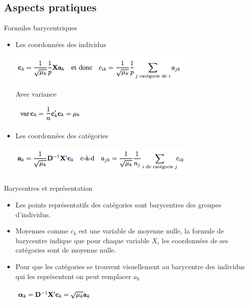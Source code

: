 \documentclass[10pt]{beamer}
\begin{document}
\subsection{Aspects pratiques}

\begin{frame}{Formules barycentriques}
 
 \begin{itemize}
 \centering
 \item  Les coordonnées des individus 
 
  \includegraphics[scale=0.7]{AFC5} 
  
  Avec variance 
  
  \includegraphics[scale=0.7]{AFC6} 
 

 \item  Les coordonnées des catégories
 
 \includegraphics[scale=0.7]{AFC7} 
 
 \end{itemize}
 
 
\end{frame}


 





\begin{frame}{ Barycentres et représentation }
 
 \begin{itemize}
 
 \item  Les points représentatifs des catégories sont barycentres des groupes d'individus.
 
 \item Moyennes comme $c_k$ est une variable de moyenne nulle, la formule de barycentre indique que pour chaque variable $X_i$
les coordonnées de ses catégories  sont de moyenne nulle. 
 
 \item  Pour que les catégories se trouvent visuellement
au barycentre des individus qui les représentent on peut
remplacer $a_k$ 

\centering

 \includegraphics[scale=0.7]{AFC8} 
 
 \end{itemize}
 
 
\end{frame}
\end{document}
